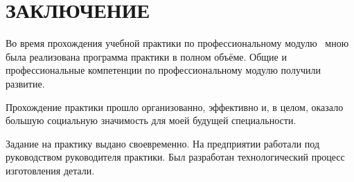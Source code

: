 \chapter*{ЗАКЛЮЧЕНИЕ}

Во время прохождения учебной практики по профессиональному
модулю \module\ мною была реализована программа практики в полном
объёме. Общие и профессиональные компетенции по профессиональному
модулю получили развитие.

Прохождение практики прошло организованно, эффективно и, в целом,
оказало большую социальную значимость для моей будущей специальности.

Задание на практику выдано своевременно. На предприятии работали под
руководством руководителя практики. Был разработан технологический
процесс изготовления детали.